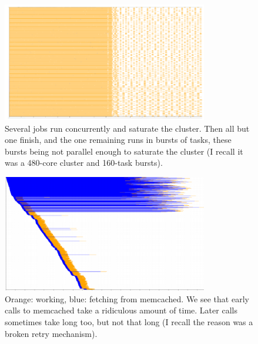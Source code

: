 \documentclass{article}
\begin{document}
\begin{figure}[p]
\center
\includegraphics[width=0.8\textwidth]{pics/splot/njobs-then-one.png}
\caption{Several jobs run concurrently and saturate the cluster. Then all but one finish, and the one remaining runs in bursts of tasks, these bursts being not parallel enough to saturate the cluster (I recall it was a 480-core cluster and 160-task bursts).}
\end{figure}

\begin{figure}[p]
\center
\includegraphics[width=0.8\textwidth]{pics/splot/very-slow-memcached.png}
\caption{Orange: working, blue: fetching from memcached. We see that early calls to memcached take a ridiculous amount of time. Later calls sometimes take long too, but not that long (I recall the reason was a broken retry mechanism).}
\end{figure}
\end{document}

